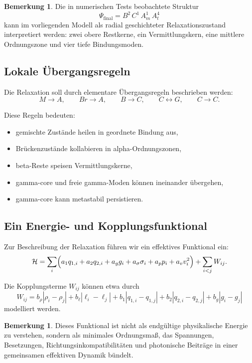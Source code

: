 \documentclass[11pt,a4paper]{article}
\theoremstyle{definition}
\newtheorem{remark}[definition]{Bemerkung}
\theoremstyle{plain}
\theoremstyle{remark}
\begin{document}
	\begin{remark}
		Die in numerischen Tests beobachtete Struktur
		\[
		\Psi_{\mathrm{final}} = B^2\,C^1\,A_m^1\,A_t^4
		\]
		kann im vorliegenden Modell als radial geschichteter Relaxationszustand interpretiert werden: zwei obere Restkerne, ein Vermittlungskern, eine mittlere Ordnungszone und vier tiefe Bindungsmoden.
	\end{remark}
	
	\subsection{Lokale Übergangsregeln}
	
	Die Relaxation soll durch elementare Übergangsregeln beschrieben werden:
	\[
	M \to A,
	\qquad
	Br \to A,
	\qquad
	B \to C,
	\qquad
	C \leftrightarrow G,
	\qquad
	C \to C.
	\]
	
	Diese Regeln bedeuten:
	\begin{itemize}
		\item gemischte Zustände heilen in geordnete Bindung aus,
		\item Brückenzustände kollabieren in alpha-Ordnungszonen,
		\item beta-Reste speisen Vermittlungskerne,
		\item gamma-core und freie gamma-Moden können ineinander übergehen,
		\item gamma-core kann metastabil persistieren.
	\end{itemize}
	
	\subsection{Ein Energie- und Kopplungsfunktional}
	
	Zur Beschreibung der Relaxation führen wir ein effektives Funktional ein:
	\[
	\mathcal{H}
	=
	\sum_i
	\Bigl(
	a_1 q_{1,i}
	+
	a_2 q_{2,i}
	+
	a_g g_i
	+
	a_\sigma \sigma_i
	+
	a_p p_i
	+
	a_v v_i^2
	\Bigr)
	+
	\sum_{i<j}W_{ij}.
	\]
	
	Die Kopplungsterme \(W_{ij}\) können etwa durch
	\[
	W_{ij}
	=
	b_\rho |\rho_i-\rho_j|
	+
	b_\ell |\ell_i-\ell_j|
	+
	b_1 |q_{1,i}-q_{1,j}|
	+
	b_2 |q_{2,i}-q_{2,j}|
	+
	b_g |g_i-g_j|
	\]
	modelliert werden.
	
	\begin{remark}
		Dieses Funktional ist nicht als endgültige physikalische Energie zu verstehen, sondern als minimales Ordnungsmaß, das Spannungen, Besetzungen, Richtungsinkompatibilitäten und photonische Beiträge in einer gemeinsamen effektiven Dynamik bündelt.
	\end{remark}
	
\end{document}
